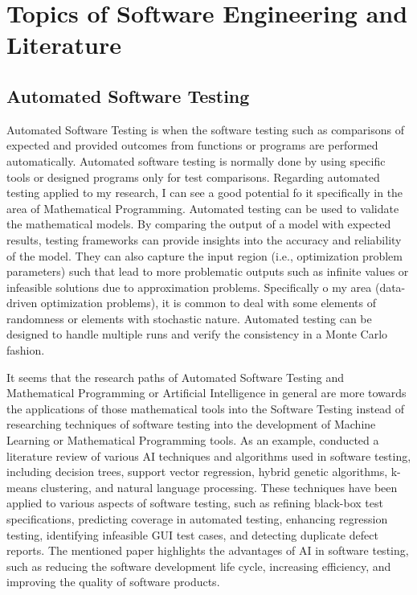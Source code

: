 \documentclass{article}
\begin{document}
\section{Topics of Software Engineering and Literature}

\subsection{Automated Software Testing}

Automated Software Testing is when the software testing such as comparisons of expected and provided outcomes from functions or programs are performed automatically. Automated software testing is normally done by using specific tools or designed programs only for test comparisons. Regarding automated testing applied to my research, I can see a good potential fo it specifically in the area of Mathematical Programming. Automated testing can be used to validate the mathematical models. By comparing the output of a model with expected results, testing frameworks can provide insights into the accuracy and reliability of the model. They can also capture the input region (i.e., optimization problem parameters) such that lead to more problematic outputs such as infinite values or infeasible solutions due to approximation problems. Specifically o my area (data-driven optimization problems), it is common to deal with some elements of randomness or elements with stochastic nature. Automated testing can be designed to handle multiple runs and verify the consistency in a Monte Carlo fashion.

It seems that the research paths of Automated Software Testing and Mathematical Programming or Artificial Intelligence in general are more towards the applications of those mathematical tools into the Software Testing instead of researching techniques of software testing into the development of Machine Learning or Mathematical Programming tools. 
As an example, \cite{hourani2019impact} conducted a literature review of various AI techniques and algorithms used in software testing, including decision trees, support vector regression, hybrid genetic algorithms, k-means clustering, and natural language processing. These techniques have been applied to various aspects of software testing, such as refining black-box test specifications, predicting coverage in automated testing, enhancing regression testing, identifying infeasible GUI test cases, and detecting duplicate defect reports. The mentioned paper highlights the advantages of AI in software testing, such as reducing the software development life cycle, increasing efficiency, and improving the quality of software products.
\end{document}
